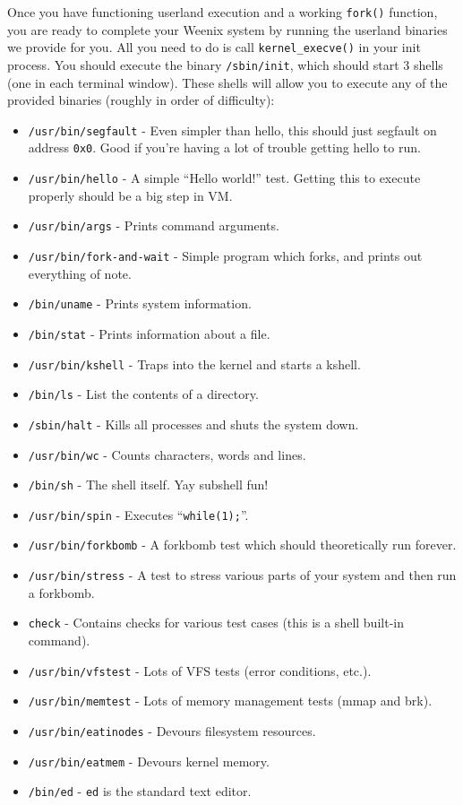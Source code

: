 Once you have functioning userland execution and a working \texttt{fork()} function, you are ready to complete your Weenix system by running the userland binaries we provide for you. All you need to do is call \texttt{kernel\_execve()} in your init process. You should execute the binary \texttt{/sbin/init}, which should start 3 shells (one in each terminal window). These shells will allow you to execute any of the provided binaries (roughly in order of difficulty):
\begin{itemize}
    \item \texttt{/usr/bin/segfault} - Even simpler than hello, this should just segfault on address \texttt{0x0}. Good if you're having a lot of trouble getting hello to run.
    \item \texttt{/usr/bin/hello} - A simple ``Hello world!'' test. Getting this to execute properly should be a big step in VM.
    \item \texttt{/usr/bin/args} - Prints command arguments.
    \item \texttt{/usr/bin/fork-and-wait} - Simple program which forks, and prints out everything of note.
    \item \texttt{/bin/uname} - Prints system information.
    \item \texttt{/bin/stat} - Prints information about a file.
    \item \texttt{/usr/bin/kshell} - Traps into the kernel and starts a kshell.
    \item \texttt{/bin/ls} - List the contents of a directory.
    \item \texttt{/sbin/halt} - Kills all processes and shuts the system down.
    \item \texttt{/usr/bin/wc} - Counts characters, words and lines.
    \item \texttt{/bin/sh} - The shell itself. Yay subshell fun!
    \item \texttt{/usr/bin/spin} - Executes ``\texttt{while(1);}''.
    \item \texttt{/usr/bin/forkbomb} - A forkbomb test which should theoretically run forever.
    \item \texttt{/usr/bin/stress} - A test to stress various parts of your system and then run a forkbomb.
    \item \texttt{check} - Contains checks for various test cases (this is a shell built-in command).
    \item \texttt{/usr/bin/vfstest} - Lots of VFS tests (error conditions, etc.).
    \item \texttt{/usr/bin/memtest} - Lots of memory management tests (mmap and brk).
    \item \texttt{/usr/bin/eatinodes} - Devours filesystem resources.
    \item \texttt{/usr/bin/eatmem} - Devours kernel memory.
    \item \texttt{/bin/ed} - \texttt{ed} is the standard text editor.
\end{itemize}

